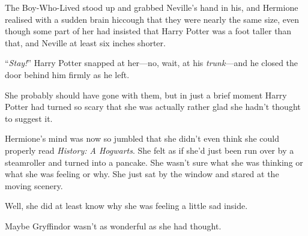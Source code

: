 The Boy-Who-Lived stood up and grabbed Neville’s hand in his, and Hermione realised with a sudden brain hiccough that they were nearly the same size, even though some part of her had insisted that Harry Potter was a foot taller than that, and Neville at least six inches shorter.

“\emph{Stay!}” Harry Potter snapped at her—no, wait, at his \emph{trunk}—and he closed the door behind him firmly as he left.

She probably should have gone with them, but in just a brief moment Harry Potter had turned so scary that she was actually rather glad she hadn’t thought to suggest it.

Hermione’s mind was now so jumbled that she didn’t even think she could properly read \emph{History: A Hogwarts}. She felt as if she’d just been run over by a steamroller and turned into a pancake. She wasn’t sure what she was thinking or what she was feeling or why. She just sat by the window and stared at the moving scenery.

Well, she did at least know why she was feeling a little sad inside.

Maybe Gryffindor wasn’t as wonderful as she had thought.


